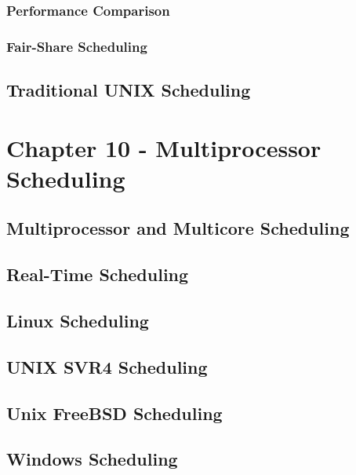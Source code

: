 \documentclass[11pt]{article}
\begin{document}
\subsubsection{Performance Comparison}
\label{sec-3-2-4}



\subsubsection{Fair-Share Scheduling}
\label{sec-3-2-5}



\subsection{Traditional UNIX Scheduling}
\label{sec-3-3}

\section{Chapter 10 - Multiprocessor Scheduling}
\label{sec-4}

\subsection{Multiprocessor and Multicore Scheduling}
\label{sec-4-1}

\subsection{Real-Time Scheduling}
\label{sec-4-2}

\subsection{Linux Scheduling}
\label{sec-4-3}

\subsection{UNIX SVR4 Scheduling}
\label{sec-4-4}

\subsection{Unix FreeBSD Scheduling}
\label{sec-4-5}

\subsection{Windows Scheduling}
\label{sec-4-6}
\end{document}
